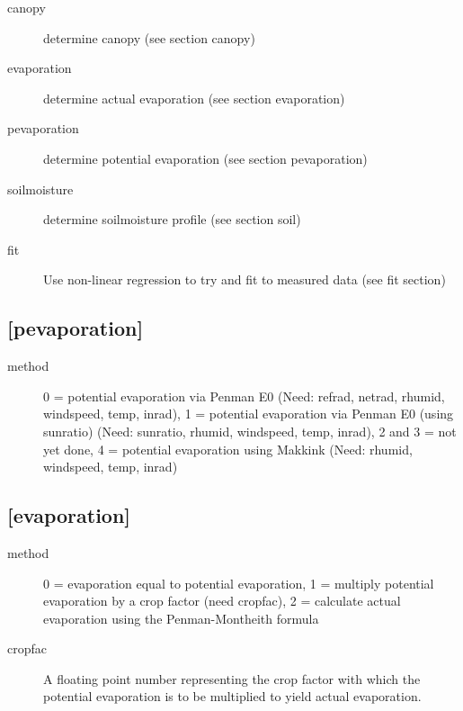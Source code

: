 \begin{description}
\item[canopy]
determine canopy (see section canopy)

\item[evaporation]
determine actual evaporation (see section evaporation)

\item[pevaporation]
determine potential evaporation (see section pevaporation)


\item[soilmoisture]
determine soilmoisture profile (see section soil)

\item[fit]
Use non-linear regression to try and fit to measured data (see fit section)
\end{description}

\subsection{[pevaporation]}\label{section:pevaporation}
\begin{description}
\item[method]
0 = potential evaporation via Penman E0 (Need: refrad, netrad, rhumid,
windspeed, temp, inrad),
1 =  potential evaporation   via  Penman E0 (using   sunratio)  (Need:
sunratio, rhumid, windspeed, temp, inrad),
2 and 3 = not yet done,
4 =  potential evaporation using    Makkink (Need: rhumid,  windspeed,
temp, inrad)
\end{description}

\subsection{[evaporation]}\label{section:evaporation}
\begin{description}
\item[method]
0 = evaporation equal to potential evaporation,
1 = multiply potential evaporation by a crop factor (need cropfac),
2 = calculate actual evaporation using the Penman-Montheith formula

\item[cropfac]
A  floating point number  representing the crop  factor with which the
potential evaporation is to be multiplied to yield actual evaporation.
\end{description}

